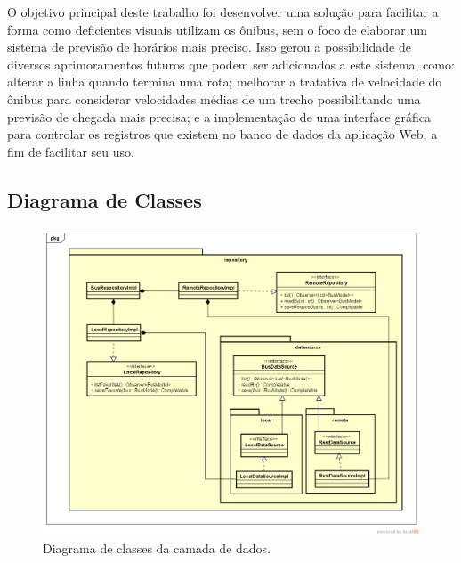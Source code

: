 \documentclass[
	12pt,				%
	oneside,			%
	a4paper,			%
	brazil				%
]{abntex2}
\begin{document}
O objetivo principal deste trabalho foi desenvolver uma solução para facilitar a forma como deficientes visuais utilizam os ônibus, sem o foco de elaborar um sistema de previsão de horários mais preciso. Isso gerou a possibilidade de diversos aprimoramentos futuros que podem ser adicionados a este sistema, como: alterar a linha quando termina uma rota; melhorar a tratativa de velocidade do ônibus para considerar velocidades médias de um trecho possibilitando uma previsão de chegada mais precisa; e a implementação de uma interface gráfica para controlar os registros que existem no banco de dados da aplicação Web, a fim de facilitar seu uso.

\postextual



\begin{apendicesenv}
\partapendices

\chapter{Diagrama de Classes}

\begin{figure}[H]
\centering
\includegraphics[width=15cm, center]{images/data-layer}
\caption{Diagrama de classes da camada de dados.}
\label{Rotulo}
\end{figure}


\end{apendicesenv}
\end{document}
